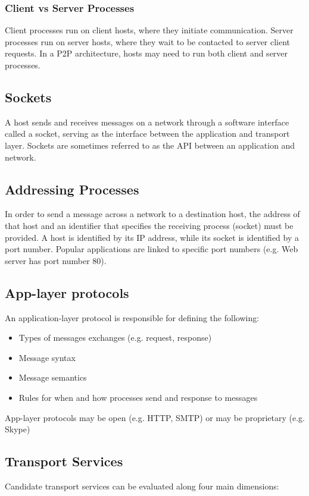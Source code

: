 \documentclass[12pt,titlepage]{article}
\begin{document}
      \subsubsection{Client vs Server Processes}
        Client processes run on client hosts, where they initiate communication. Server processes run on server hosts, where they wait to be contacted to server client requests.
        In a P2P architecture, hosts may need to run both client and server processes.

    \subsection{Sockets}
      A host sends and receives messages on a network through a software interface called a socket, serving as the interface between the application and transport layer. Sockets
      are sometimes referred to as the API between an application and network.

    \subsection{Addressing Processes}
      In order to send a message across a network to a destination host, the address of that host and an identifier that specifies the receiving process (socket) must be provided.
      A host is identified by its IP address, while its socket is identified by a port number. Popular applications are linked to specific port numbers (e.g. Web server has port
      number 80).

    \subsection{App-layer protocols}
      An application-layer protocol is responsible for defining the following:
      \begin{itemize}
        \item Types of messages exchanges (e.g. request, response)
        \item Message syntax
        \item Message semantics
        \item Rules for when and how processes send and response to messages
      \end{itemize}
      App-layer protocols may be open (e.g. HTTP, SMTP) or may be proprietary (e.g. Skype)

    \subsection{Transport Services}
      Candidate transport services can be evaluated along four main dimensions:
\end{document}
